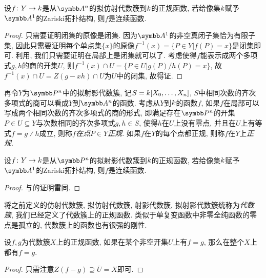 \begin{proposition}\label{prop:affineregularcontinuous}
    设$f\colon Y\to k$是从$\AF^n$的拟仿射代数簇到$k$的正规函数, 若给像集$k$赋予$\AF^1$的Zariski拓扑结构, 则$f$是连续函数.
\end{proposition}

\begin{proof}
    只需要证明闭集的原像是闭集. 因为$\AF^1$的非空真闭子集恰为有限子集, 因此只需要证明每个单点集$\{x\}$的原像$f^{-1}(x)=\{P\in Y\vert f(P)=x\}$是闭集即可. 利用, 我们只需要证明在局部上是闭集就可以了. 考虑使得$f$能表示成两个多项式$g, h$的商的开集$U$, 则$f^{-1}(x)\cap U=\{P\in U\vert g(P)/h(P)=x\}$, 故$f^{-1}(x)\cap U=Z(g-xh)\cap U$为$U$中的闭集, 故得证.
\end{proof}

再令$Y$为$\PP^n$中的拟射影代数簇, 记$S=k [X_0, \dotsc, X_n]$, $S$中相同次数的齐次多项式的商可以看成$Y$到$\AF^n$的函数. 考虑从$Y$到$k$的函数$f$, 如果$f$在局部可以写成两个相同次数的齐次多项式的商的形式, 即满足存在$\PP^n$的开集$P\in U\subseteq Y$与次数相同的齐次多项式$g, h\in S$, 使得$h$在$U$上没有零点, 并且在$U$上有等式$f=g{\divslash}h$成立, 则称$f$\emph{在点$P\in Y$正规}. 如果$f$在$Y$的每个点都正规, 则称$f$在$Y$上\emph{正规}.

\begin{proposition}\label{prop:projregularcontinuous}
    设$f\colon Y\to k$是从$\PP^n$的拟射影代数簇到$k$的正规函数, 若给像集$k$赋予$\AF^1$的Zariski拓扑结构, 则$f$是连续函数.
\end{proposition}

\begin{proof}
    与的证明雷同.
\end{proof}

将之前定义的仿射代数簇, 拟仿射代数簇, 射影代数簇, 拟射影代数簇统称为\emph{代数簇}, 我们已经定义了代数簇上的正规函数. 类似于单复变函数中非零全纯函数的零点是孤立的\parencite[127]{ahlfors_complex_1978}, 代数簇上的函数也有很强的刚性.

\begin{proposition}\label{prop:regularstiffness}
    设$f, g$为代数簇$X$上的正规函数, 如果在某个非空开集$U$上有$f=g$, 那么在整个$X$上都有$f=g$.
\end{proposition}

\begin{proof}
    只需注意$Z(f-g)\supseteq \overline{U}=X$即可.
\end{proof}

